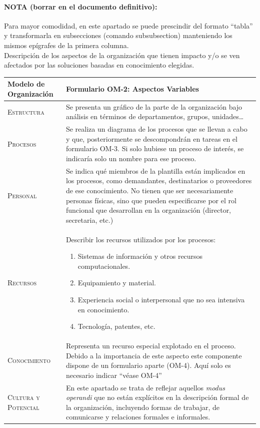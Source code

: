 \documentclass[12pt,a4paper,twoside,spanish]{article}      %
\begin{document}
\paragraph{NOTA (borrar en el documento definitivo):} Para mayor comodidad, en este apartado se puede  prescindir  del  formato  ``tabla''  y  transformarla  en  subsecciones  (comando  subsubsection) manteniendo los mismos epígrafes de la primera columna. \\


Descripción de los aspectos de la organización que tienen impacto y/o se ven afectados
  por las soluciones basadas en conocimiento elegidas.


\begin{table}[H]
\scriptsize
\begin{tabularx}{\textwidth}{|l|X|} \hline
\textbf{Modelo de Organización} & \textbf{Formulario OM-2: Aspectos Variables} \\ \hline\hline

\textsc{Estructura} & Se presenta un gráfico de la parte de la organización bajo análisis en términos de
departamentos, grupos, unidades\ldots\\ \hline
\textsc{Procesos} & Se realiza un diagrama de los procesos que se llevan a cabo y que, posteriormente se descompondrán en tareas en el formulario OM-3. Si solo hubiese un proceso de interés, se indicaría solo un nombre para ese proceso.\\ \hline
\textsc{Personal} &  Se indica qué miembros de la plantilla están implicados en los procesos, como demandantes, destinatarios o proveedores de ese conocimiento. No tienen que ser necesariamente personas físicas, sino que pueden especificarse por el rol
funcional que desarrollan en la organización (director, secretaria, etc.)\\ \hline
\textsc{Recursos} &  Describir los recursos utilizados por los procesos:
\begin{enumerate}
    \item Sistemas de información y otros recursos computacionales.
    \item Equipamiento y material.
    \item Experiencia social o interpersonal que no sea intensiva en conocimiento.
    \item Tecnología, patentes, etc.
\end{enumerate}
\\ \hline
\textsc{Conocimiento} &  Representa un recurso especial explotado en el proceso. Debido a la
importancia de este aspecto este componente dispone de un formulario aparte (OM-4). Aquí solo es necesario indicar ``véase OM-4'' \\ \hline
\textsc{Cultura y Potencial} &  En este apartado se trata de reflejar aquellos \textit{modus operandi} que no están explícitos en la descripción formal de la organización, incluyendo formas de trabajar, de comunicarse y relaciones formales e informales.\\ \hline
\end{tabularx}
  \label{tab.OM2}
\end{table}
\end{document}
